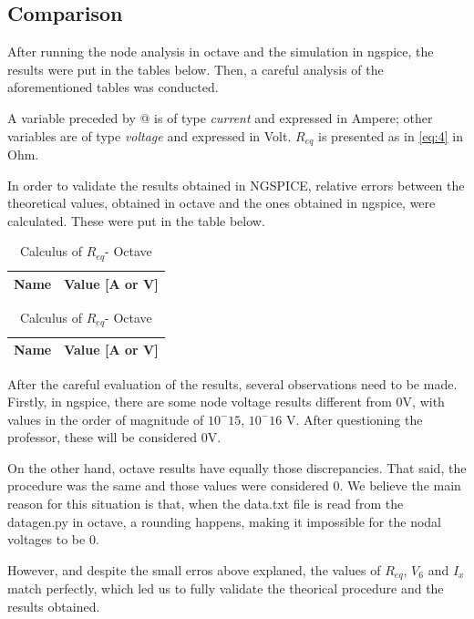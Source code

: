 \subsection{Comparison}
After running the node analysis in octave and the simulation in ngspice, the results were put in the tables below. Then, a careful analysis of the aforementioned tables was conducted.

A variable preceded by @ is of type {\em current} and expressed in Ampere; other variables are of type {\it voltage} and expressed in
    Volt. $R_{eq}$ is presented as in \ref{eq:4} in Ohm.

In order to validate the results obtained in NGSPICE, relative errors between the theoretical values, obtained in octave and the ones obtained in ngspice, were calculated. These were put in the table below.

\begin{table}[ht]
\parbox{.30\linewidth}{
  \centering
  \begin{tabular}{|l|r|}
    \hline    
    {\bf Name} & {\bf Value [A or V]} \\ \hline
    
  \end{tabular}
  \caption{Simulation and Calculus of Req (NgSpice)}} 
\parbox{.30\linewidth}{
  \centering
  \begin{tabular}{|l|r|}
    \hline    
    {\bf Name} & {\bf Value [A or V]} \\ \hline
    
  \end{tabular}
  \caption{Calculus of $R_{eq}$- Octave}}
 
\end{table}

\par After the careful evaluation of the results, several observations need to be made. Firstly, in ngspice, there are some node voltage results different from 0V, with  values  in the order of magnitude of $10^-15$, $10^-16$ V. After questioning the professor, these will be considered 0V.

\par On the other hand, octave results have equally those discrepancies. That said, the procedure was the same and those values were considered 0. We believe the main reason for this situation is that, when the data.txt file is read from the datagen.py in octave, a rounding happens, making it impossible for the nodal voltages to be 0. 

\par However, and despite the small erros above explaned, the values of $R_{eq}$, $V_{6}$ and $I_{x}$ match perfectly, which led us to fully validate the theorical procedure and the results obtained.




 


